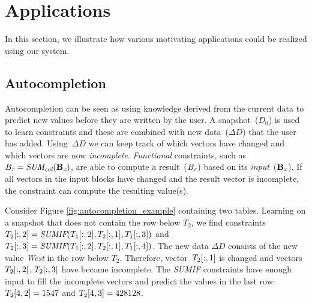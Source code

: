 



\section{Applications}\label{sec:applications}
In this section, we illustrate how various motivating applications could be realized using our system.





\subsection{Autocompletion}
Autocompletion can be seen as using knowledge derived from the current data to predict new values before they are written by the user.
A snapshot~($D_0$) is used to learn constraints and these are combined with new data~($\Delta D$) that the user has added.
Using~$\Delta D$ we can keep track of which vectors have changed and which vectors are now \textit{incomplete}.
\textit{Functional} constraints, such as $B_{\textit{r}} = \textit{SUM\textsubscript{col}}(\mathbf{B_{\textit{x}}})$, are able to compute a result~($B_{\textit{r}}$) based on its \textit{input}~($\mathbf{B_{\textit{x}}}$).
If all vectors in the input blocks have changed and the result vector is incomplete, the constraint can compute the resulting value(s).

Consider Figure \ref{fig:autocompletion_example} containing two tables.
Learning on a snapshot that does not contain the row below $T_2$, we find constraints $T_2[:,2] = \textit{SUMIF}(T_1[:,2], T_2[:,1], T_1[:,3])$ and $T_2[:,3] = \textit{SUMIF}(T_1[:,2], T_2[:,1], T_1[:,4])$.
The new data $\Delta D$ consists of the new value \textit{West} in the row below $T_2$.
Therefore, vector~$T_2[:,1]$ is changed and vectors~$T_2[:,2]$, $T_2[:,3]$ have become incomplete.
The \textit{SUMIF} constraints have enough input to fill the incomplete vectors and predict the values in the last row: $T_2[4,2] = 1547$ and $T_2[4,3] = 428128$.


